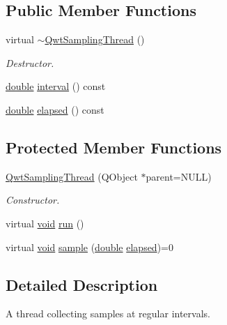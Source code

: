 \subsection*{Public Member Functions}
\begin{DoxyCompactItemize}
\item 
virtual \hyperlink{class_qwt_sampling_thread_a7a0b4d5c172f2ded5f6b6483c6ab56e5}{$\sim$\-Qwt\-Sampling\-Thread} ()
\begin{DoxyCompactList}\small\item\em Destructor. \end{DoxyCompactList}\item 
\hyperlink{_super_l_u_support_8h_a8956b2b9f49bf918deed98379d159ca7}{double} \hyperlink{class_qwt_sampling_thread_a4a2f5038c02c8cad5ebc1fae01480e73}{interval} () const 
\item 
\hyperlink{_super_l_u_support_8h_a8956b2b9f49bf918deed98379d159ca7}{double} \hyperlink{class_qwt_sampling_thread_a27ebf049b4fc423bdb172d9036eb6683}{elapsed} () const 
\end{DoxyCompactItemize}
\subsection*{Protected Member Functions}
\begin{DoxyCompactItemize}
\item 
\hyperlink{class_qwt_sampling_thread_afb02e4696306d5211b4b6470410afbfc}{Qwt\-Sampling\-Thread} (Q\-Object $\ast$parent=N\-U\-L\-L)
\begin{DoxyCompactList}\small\item\em Constructor. \end{DoxyCompactList}\item 
virtual \hyperlink{group___u_a_v_objects_plugin_ga444cf2ff3f0ecbe028adce838d373f5c}{void} \hyperlink{class_qwt_sampling_thread_a247354fcc8e2597e105d87a2cfaa0a96}{run} ()
\item 
virtual \hyperlink{group___u_a_v_objects_plugin_ga444cf2ff3f0ecbe028adce838d373f5c}{void} \hyperlink{class_qwt_sampling_thread_a67c4a524736808dc1ba3b81670c0cbd5}{sample} (\hyperlink{_super_l_u_support_8h_a8956b2b9f49bf918deed98379d159ca7}{double} \hyperlink{class_qwt_sampling_thread_a27ebf049b4fc423bdb172d9036eb6683}{elapsed})=0
\end{DoxyCompactItemize}


\subsection{Detailed Description}
A thread collecting samples at regular intervals. 

